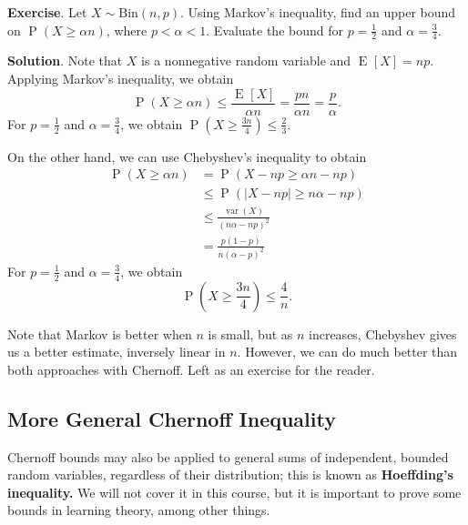 \documentclass[14pt]{extreport}
\newcommand{\Var}[1]{\operatorname{var}\left(#1\right)}
\newcommand{\E}[2][]{\operatorname{E}_{#1}\left[#2\right]}
\renewcommand{\Pr}[1]{\operatorname{P}\left(#1\right)}
\begin{document}
    \vspace{5mm}
    \textbf{Exercise}.
    Let $X \sim \text{Bin}(n, p)$. Using Markov's inequality, find an upper bound on $\Pr{X\ge \alpha n}$, where $p < \alpha < 1$. Evaluate the bound for $p = \frac{1}{2}$ and $\alpha = \frac{3}{4}$.

    \vspace{3mm}
    \textbf{Solution}.
    Note that $X$ is a nonnegative random variable and $\E{X} = np$. Applying Markov's inequality, we obtain $$\Pr{X \ge \alpha n} \le \frac{\E{X}}{\alpha n} = \frac{pn}{\alpha n} = \frac{p}{\alpha}.$$ For $p = \frac{1}{2}$ and $\alpha = \frac{3}{4}$, we obtain $\Pr{X \ge \frac{3n}{4}} \le \frac{2}{3}$.

    \vspace{3mm}
    On the other hand, we can use Chebyshev's inequality to obtain 
    $$\begin{aligned}
        \Pr{X \ge \alpha n} &= \Pr{X - np \ge \alpha n - np} \\
        &\le \Pr{|X - np| \ge n\alpha - n p} \\
        &\le \frac{\Var{X}}{(n\alpha - np)^{2}} \\
        &= \frac{p(1 - p)}{n(\alpha - p)^{2}}
    \end{aligned}$$
    For $p = \frac{1}{2}$ and $\alpha = \frac{3}{4}$, we obtain $$\Pr{X \ge \frac{3n}{4}} \le \frac{4}{n}.$$

    \vspace{3mm}
    Note that Markov is better when $n$ is small, but as $n$ increases, Chebyshev gives us a better estimate, inversely linear in $n$. However, we can do much better than both approaches with Chernoff. Left as an exercise for the reader.

\subsection*{More General Chernoff Inequality}
    Chernoff bounds may also be applied to general sums of independent, bounded random variables, regardless of their distribution; this is known as \textbf{Hoeffding's inequality.} We will not cover it in this course, but it is important to prove some bounds in learning theory, among other things.
\end{document}
